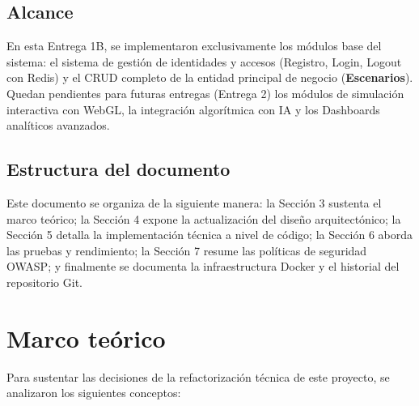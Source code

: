 \documentclass[12pt]{article}
\begin{document}
\subsection{Alcance}
En esta Entrega 1B, se implementaron exclusivamente los módulos base del sistema: el sistema de gestión de identidades y accesos (Registro, Login, Logout con Redis) y el CRUD completo de la entidad principal de negocio (\textbf{Escenarios}). Quedan pendientes para futuras entregas (Entrega 2) los módulos de simulación interactiva con WebGL, la integración algorítmica con IA y los Dashboards analíticos avanzados.

\subsection{Estructura del documento}
Este documento se organiza de la siguiente manera: la Sección 3 sustenta el marco teórico; la Sección 4 expone la actualización del diseño arquitectónico; la Sección 5 detalla la implementación técnica a nivel de código; la Sección 6 aborda las pruebas y rendimiento; la Sección 7 resume las políticas de seguridad OWASP; y finalmente se documenta la infraestructura Docker y el historial del repositorio Git.

\section{Marco teórico}
Para sustentar las decisiones de la refactorización técnica de este proyecto, se analizaron los siguientes conceptos:
\end{document}
